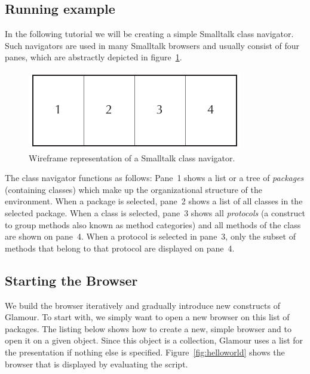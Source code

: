 \documentclass[a4paper,10pt,twoside]{book}
\begin{document}
\subsection{Running example}
\label{sec:tutorial/getting_started}

In the following tutorial we will be creating a simple Smalltalk class
navigator. Such navigators are used in many Smalltalk browsers and
usually consist of four panes, which are abstractly depicted in
figure~\ref{fig:classnavigator_wireframe}.

\begin{figure}[htbp]
\centerline{\includegraphics[width=\linewidth]{classnavigator_wireframe.pdf}}
\caption{Wireframe representation of a Smalltalk class navigator.}
\label{fig:classnavigator_wireframe}
\end{figure}

The class navigator functions as follows: Pane~1 shows a list or a
tree of \emph{packages} (containing classes) which make up the
organizational structure of the environment. When a package is
selected, pane~2 shows a list of all classes in the selected
package. When a class is selected, pane~3 shows all \emph{protocols}
(a construct to group methods also known as method categories) and all
methods of the class are shown on pane~4. When a protocol is
selected in pane~3, only the subset of methods that belong to that
protocol are displayed on pane~4.


\subsection{Starting the Browser}

We build the browser iteratively and gradually introduce new
constructs of Glamour. To start with, we simply want to open a new
browser on this list of packages. The listing below shows how to
create a new, simple browser and to open it on a given object. Since
this object is a collection, Glamour uses a list for the presentation
if nothing else is specified. Figure~\ref{fig:helloworld} shows the
browser that is displayed by evaluating the script.
\end{document}
